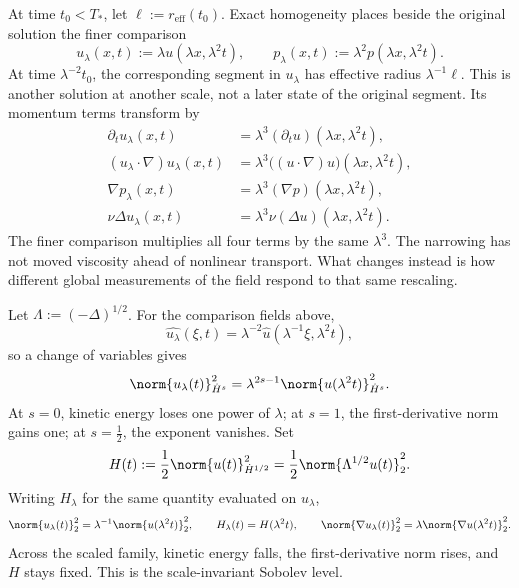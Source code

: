 
At time \(t_0<T_*\), let \(\ell:=r_{\mathrm{eff}}(t_0)\). Exact \NavierStokes{} homogeneity places beside the original solution the finer comparison
\[
  u_\lambda(x,t)
  :=
  \lambda u(\lambda x,\lambda^2t),
  \qquad
  p_\lambda(x,t)
  :=
  \lambda^2p(\lambda x,\lambda^2t).
\]
At time \(\lambda^{-2}t_0\), the corresponding segment in \(u_\lambda\) has effective radius \(\lambda^{-1}\ell\). This is another solution at another scale, not a later state of the original segment. Its momentum terms transform by
\[
\begin{aligned}
  \partial_tu_\lambda(x,t)
  &=
  \lambda^3(\partial_tu)(\lambda x,\lambda^2t),
  \\
  (u_\lambda\cdot\nabla)u_\lambda(x,t)
  &=
  \lambda^3\bigl((u\cdot\nabla)u\bigr)(\lambda x,\lambda^2t),
  \\
  \nabla p_\lambda(x,t)
  &=
  \lambda^3(\nabla p)(\lambda x,\lambda^2t),
  \\
  \nu\Delta u_\lambda(x,t)
  &=
  \lambda^3\nu(\Delta u)(\lambda x,\lambda^2t).
\end{aligned}
\]
The finer comparison multiplies all four terms by the same \(\lambda^3\). The narrowing has not moved viscosity ahead of nonlinear transport. What changes instead is how different global measurements of the field respond to that same rescaling.


Let \(\Lambda:=(-\Delta)^{1/2}\). For the comparison fields above,
\[
  \widehat{u_\lambda}(\xi,t)
  =
  \lambda^{-2}\widehat u(\lambda^{-1}\xi,\lambda^2t),
\]
so a change of variables gives
\[
  \norm{u_\lambda(t)}_{\dot H^s}^2
  =
  \lambda^{2s-1}
  \norm{u(\lambda^2t)}_{\dot H^s}^2.
\]
At \(s=0\), kinetic energy loses one power of \(\lambda\); at \(s=1\), the first-derivative norm gains one; at \(s=\tfrac12\), the exponent vanishes. Set
\[
  H(t)
  :=
  \frac12\norm{u(t)}_{\dot H^{1/2}}^2
  =
  \frac12\norm{\Lambda^{1/2}u(t)}_2^2.
\]
Writing \(H_\lambda\) for the same quantity evaluated on \(u_\lambda\),
\[
  \norm{u_\lambda(t)}_2^2
  =
  \lambda^{-1}\norm{u(\lambda^2t)}_2^2,
  \qquad
  H_\lambda(t)=H(\lambda^2t),
  \qquad
  \norm{\nabla u_\lambda(t)}_2^2
  =
  \lambda\norm{\nabla u(\lambda^2t)}_2^2.
\]
Across the scaled family, kinetic energy falls, the first-derivative norm rises, and \(H\) stays fixed. This is the scale-invariant Sobolev level.


